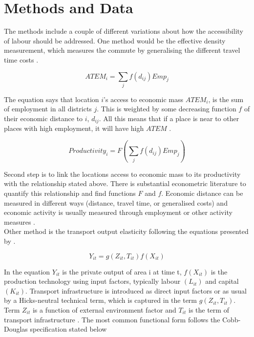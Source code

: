 \documentclass[a4paper, 12 pt]{article}   	%
\begin{document}
\section{Methods and Data}

The methods include a couple of different variations about how the accessibility of labour should be addressed. One method would be the effective density measurement, which measures the commute by generalising the different travel time costs \citep{venables2017}. 

\begin{equation}
ATEM_i = \sum_j f(d_{ij})Emp_j
\end{equation}

The equation says that location $i$'s access to economic mass $ATEM_i$, is the sum of employment in all districts $j$. This is weighted by some decreasing function $f$ of their economic distance to $i$, $d_{ij}$. All this means that if a place is near to other places with high employment, it will have high $ATEM$ \citep{venables2017}.  

\begin{equation}
Productivity_i = F(\sum_j f(d_{ij})Emp_j)
\end{equation}

Second step is to link the locations access to economic mass to its productivity with the relationship stated above. There is substantial econometric literature to quantify this relationship and find functions $F$ and $f$. Economic distance can be measured in different ways (distance, travel time, or generalised costs) and economic activity is usually measured through employment or other activity measures \citep{venables2017}.\\

Other method is the transport output elasticity following the equations presented by \citep{melo}.

\begin{equation}
Y_{it} = g(Z_{it}, T_{it}) f(X_{it})
\end{equation}

In the equation $Y_{it}$ is the private output of area i at time t, $f(X_{it})$ is the production technology using input factors, typically labour $(L_{it})$ and capital $(K_{it})$. Transport infrastructure is introduced as direct input factors or as usual by a Hicks-neutral technical term, which is captured in the term $g(Z_{it}, T_{it})$. Term $Z_{it}$ is a function of external environment factor and $T_{it}$ is the term of transport infrastructure \citep{melo}. 
The most common functional form follows the Cobb-Douglas specification stated below \citep{melo}
\end{document}
